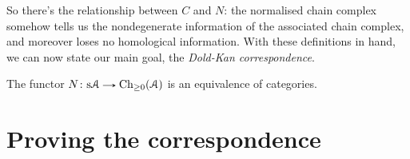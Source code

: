 So there's the relationship between $C$ and $N$: the normalised chain
complex somehow tells us the nondegenerate information of the
associated chain complex, and moreover loses no homological
information. With these definitions in hand, we can now state our main
goal, the \textit{Dold-Kan correspondence}.

\begin{theorem}
  \label{doldkan}
  The functor $N \c \s\A \to \Ch_{\ge 0}(\A)$ is an equivalence of
  categories.
\end{theorem}


\section{Proving the correspondence}

